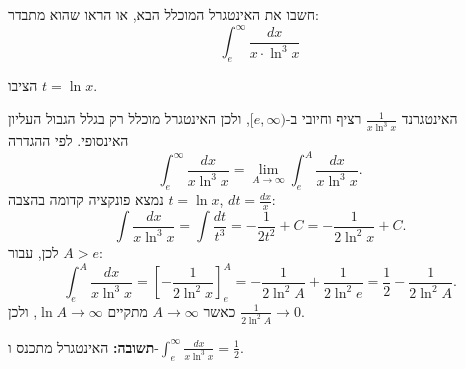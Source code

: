
\begin{question}
חשבו את האינטגרל המוכלל הבא, או הראו שהוא מתבדר:
\[ \int_e^\infty \frac{dx}{x \cdot \ln^3 x} \]
\end{question}

\begin{hint}
הציבו $t = \ln x$.
\end{hint}

\begin{solution}
האינטגרנד $\frac{1}{x\ln^3 x}$ רציף וחיובי ב-$[e, \infty)$, ולכן האינטגרל מוכלל רק בגלל הגבול העליון האינסופי. לפי ההגדרה
\[ \int_e^\infty \frac{dx}{x\ln^3 x} = \lim_{A\to\infty} \int_e^A \frac{dx}{x\ln^3 x}. \]
נמצא פונקציה קדומה בהצבה $t = \ln x$, $dt = \frac{dx}{x}$:
\[ \int \frac{dx}{x\ln^3 x} = \int \frac{dt}{t^3} = -\frac{1}{2t^2} + C = -\frac{1}{2\ln^2 x} + C. \]
לכן, עבור $A > e$:
\[ \int_e^A \frac{dx}{x\ln^3 x} = \left[ -\frac{1}{2\ln^2 x} \right]_e^A = -\frac{1}{2\ln^2 A} + \frac{1}{2\ln^2 e} = \frac12 - \frac{1}{2\ln^2 A}. \]
כאשר $A \to \infty$ מתקיים $\ln A \to \infty$, ולכן $\frac{1}{2\ln^2 A} \to 0$.

\textbf{תשובה:} האינטגרל מתכנס ו-$\boxed{\int_e^\infty \frac{dx}{x\ln^3 x} = \frac12}$.
\end{solution}
